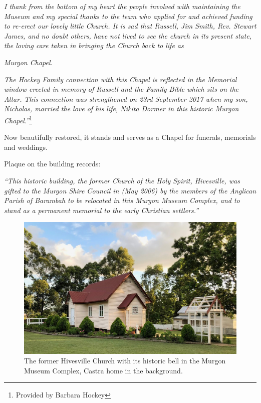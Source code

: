 \emph{I thank from the bottom of my heart the people involved with maintaining the Museum and my special thanks to the team who applied for and achieved funding to re-erect our lovely little Church. It is sad that Russell, Jim Smith, Rev. Stewart James, and no doubt others, have not lived to see the church in its present state, the loving care taken in bringing the Church back to life as}



\emph{Murgon Chapel.}



\emph{The Hockey Family connection with this Chapel is reflected in the Memorial window erected in memory of Russell and the Family Bible which sits on the Altar. This connection was strengthened on 23rd September 2017 when my son, Nicholas, married the love of his life, Nikita Dormer in this historic Murgon Chapel.''}\footnote{Provided by Barbara Hockey}


\medskip


Now beautifully restored, it stands and serves as a Chapel for funerals, memorials and weddings.



Plaque on the building records:



\emph{``This historic building, the former Church of the Holy Spirit, Hivesville, was gifted to the Murgon Shire Council in (May 2006) by the members of the Anglican Parish of Barambah to be relocated in this Murgon Museum Complex, and to stand as a permanent memorial to the early Christian settlers.''}









\begin{figure}[!htb]
\begin{center}
\includegraphics[width=1.\textwidth,center]{../images/hivesvilleChurchToday.jpg}
\caption{The former Hivesville Church with its historic bell in the Murgon Museum Complex, Castra home in the background.}
\end{center}
\end{figure}




